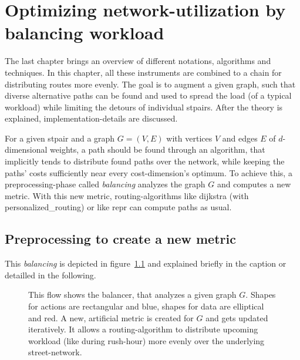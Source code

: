 \chapter{Optimizing network-utilization by balancing workload}
\label{chap:balancing}

The last chapter brings an overview of different notations, algorithms and techniques.
In this chapter, all these instruments are combined to a chain for distributing routes more evenly.
The goal is to augment a given graph, such that diverse alternative paths can be found and used to spread the load (of a typical workload) while limiting the detours of individual \glspl{stpair}.
After the theory is explained, implementation-details are discussed.

For a given \gls{stpair} and a graph $G = (V, E)$ with vertices $V$ and edges $E$ of $d$-dimensional \glspl{weight}, a path should be found through an algorithm, that implicitly tends to distribute found paths over the network, while keeping the paths' \glspl{cost} sufficiently near every \gls{cost}-dimension's optimum.
To achieve this, a preprocessing-phase called \textit{balancing} analyzes the graph $G$ and computes a new \gls{metric}.
With this new \gls{metric}, routing-algorithms like \gls{dijkstra}  (with \gls{personalized_routing}) or like \gls{repr} can compute paths as usual.

\section{Preprocessing to create a new metric}


    This \textit{balancing} is depicted in figure~\ref{fig:balancing} and explained briefly in the caption or detailled in the following.

    \begin{figure}
        \centering
        
        \caption[Overview of balancing a graph]{%
            This flow shows the balancer, that analyzes a given graph $G$.
            Shapes for actions are rectangular and blue, shapes for data are elliptical and red.
            A new, artificial \gls{metric} is created for $G$ and gets updated iteratively.
            It allows a routing-algorithm to distribute upcoming workload (like during rush-hour) more evenly over the underlying street-network.
            \label{fig:balancing}
        }
    \end{figure}

